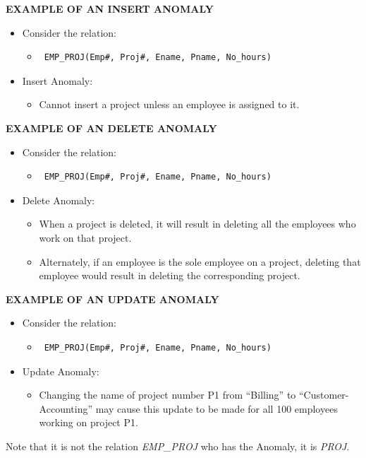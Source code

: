 \textbf{EXAMPLE OF AN INSERT ANOMALY}
\begin{itemize}
    \item Consider the relation:
    \begin{itemize}
        \item  \begin{verbatim} EMP_PROJ(Emp#, Proj#, Ename, Pname, No_hours) \end{verbatim}
    \end{itemize}
    \item Insert Anomaly:
    \begin{itemize}
        \item Cannot insert a project unless an employee is
            assigned to it.
    \end{itemize}
\end{itemize}


\textbf{EXAMPLE OF AN DELETE ANOMALY}
\begin{itemize}
    \item Consider the relation:
    \begin{itemize}
        \item  \begin{verbatim} EMP_PROJ(Emp#, Proj#, Ename, Pname, No_hours) \end{verbatim}
    \end{itemize}
    \item Delete Anomaly:
    \begin{itemize}
        \item When a project is deleted, it will result in deleting
            all the employees who work on that project.
        \item Alternately, if an employee is the sole employee
            on a project, deleting that employee would result in
            deleting the corresponding project.
    \end{itemize}
\end{itemize}


\textbf{EXAMPLE OF AN UPDATE ANOMALY}
\begin{itemize}
    \item Consider the relation:
    \begin{itemize}
        \item  \begin{verbatim} EMP_PROJ(Emp#, Proj#, Ename, Pname, No_hours) \end{verbatim}
    \end{itemize}
    \item Update Anomaly:
    \begin{itemize}
        \item Changing the name of project number P1 from
            “Billing” to “Customer-Accounting” may cause this
            update to be made for all 100 employees working
            on project P1.
    \end{itemize}
\end{itemize}
Note that it is not the relation \textit{EMP\_PROJ}
who has the Anomaly, it is \textit{PROJ}.

